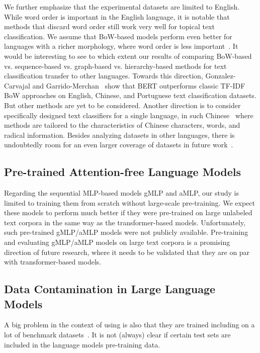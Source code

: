 We further emphasize that the experimental datasets are limited to English.
While word order is important in the English language, 
it is notable that methods that discard word order still work very well for topical text classification.
We assume that BoW-based models perform even better for languages with a richer morphology, where word order is less important~\cite{nowak_emergence_2016}.
It would be interesting to see to which extent our results of comparing BoW-based vs. sequence-based vs. graph-based vs. hierarchy-based methods for text classification transfer to other languages.
Towards this direction, Gonzalez-Carvajal and Garrido-Merchan~\cite{gonzales-2020-comparing-bert} show that BERT outperforms classic TF-IDF BoW approaches on English, Chinese, and Portuguese text classification datasets.
But other methods are yet to be considered.
Another direction is to consider specifically designed text classifiers for a single language, \eg in such Chinese~\cite{9837023-chinese} where methods are tailored to the characteristics of Chinese characters, words, and radical information.
Besides analyzing datasets in other languages, there is undoubtedly room for an even larger coverage of datasets in future work~\cite{Bhatia16}. 

\subsection{Pre-trained Attention-free Language Models}
Regarding the sequential MLP-based models gMLP and aMLP, our study is limited to training them from scratch without large-scale pre-training. 
We expect these models to perform much better if they were pre-trained on large unlabeled text corpora in the same way as the transformer-based models.
Unfortunately, such pre-trained gMLP/aMLP models were not publicly available. Pre-training and evaluating gMLP/aMLP models on large text corpora is a promising direction of future research, where it needs to be validated that they are on par with transformer-based models.

\subsection{Data Contamination in Large Language Models}
A big problem in the context of using \GenLMs is also that they are trained including on a lot of benchmark datasets~\cite{balloccuLeakCheatRepeat2024}.
It is not (always) clear if certain test sets are included in the language models pre-training data.

